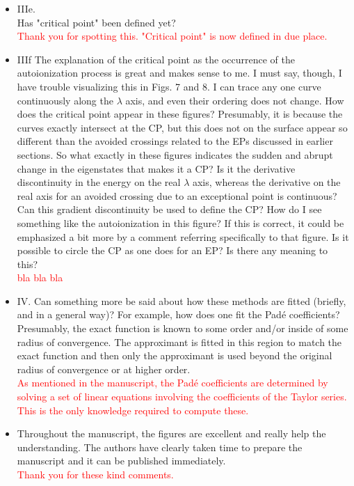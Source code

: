 \documentclass[10pt]{letter}
\newcommand{\alert}[1]{\textcolor{red}{#1}}
\begin{document}
\begin{letter}
\begin{itemize}
\item 
	{IIIe.\\
	Has "critical point" been defined yet?}
	\\
	\alert{Thank you for spotting this. 
	"Critical point" is now defined in due place.}

\item 
	{IIIf
	The explanation of the critical point as the occurrence of the autoionization process is great and makes sense to me. 
	I must say, though, I have trouble visualizing this in Figs. 7 and 8. 
	I can trace any one curve continuously along the $\lambda$ axis, and even their ordering does not change. 
	How does the critical point appear in these figures? 
	Presumably, it is because the curves exactly intersect at the CP, but this does not on the surface appear so different than the avoided crossings related to the EPs discussed in earlier sections.
	So what exactly in these figures indicates the sudden and abrupt change in the eigenstates that makes it a CP? 
	Is it the derivative discontinuity in the energy on the real $\lambda$ axis, whereas the derivative on the real axis for an avoided crossing due to an exceptional point is continuous? 
	Can this gradient discontinuity be used to define the CP? 
	How do I see something like the autoionization in this figure? 
	If this is correct, it could be emphasized a bit more by a comment referring specifically to that figure.
	Is it possible to circle the CP as one does for an EP? 
	Is there any meaning to this?}
	\\
	\alert{bla bla bla}

\item 
	{IV.
	Can something more be said about how these methods are fitted (briefly, and in a general way)? 
	For example, how does one fit the Pad\'e coefficients? 
	Presumably, the exact function is known to some order and/or inside of some radius of convergence. 
	The approximant is fitted in this region to match the exact function and then only the approximant is used beyond the original radius of convergence or at higher order.}
	\\
	\alert{As mentioned in the manuscript, the Pad\'e coefficients are determined by solving a set of linear equations involving the coefficients of the Taylor series.
	This is the  only knowledge required to compute these.}

\item 
	{Throughout the manuscript, the figures are excellent and really help the understanding. 
	The authors have clearly taken time to prepare the manuscript and it can be published immediately.}
	\\
	\alert{Thank you for these kind comments.}
	
\end{itemize}
 
\end{letter}
\end{document}
